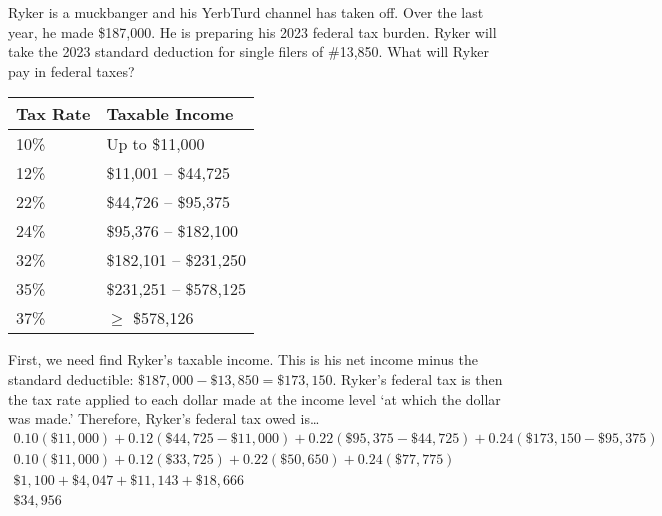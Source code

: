 \documentclass[12pt,letterpaper]{exam}
\begin{document}
\examtitle
{} 
\scores
\bottomline
\newpage

\begin{questions}

\newpage
\question[10] Ryker is a muckbanger and his YerbTurd channel has taken off. Over the last year, he made \$187,000. He is preparing his 2023 federal tax burden. Ryker will take the 2023 standard deduction for single filers of \#13,850. What will Ryker pay in federal taxes? 
	\begin{table}[H]
	\centering
	\begin{tabular}{|l|l|} \hline
	Tax Rate & Taxable Income \\ \hline \hline
	10\% & Up to \$11,000 \\ \hline
	12\% & \$11,001 -- \$44,725 \\ \hline
	22\% & \$44,726 -- \$95,375 \\ \hline
	24\% & \$95,376 -- \$182,100 \\ \hline
	32\% & \$182,101 -- \$231,250 \\ \hline
	35\% & \$231,251 -- \$578,125 \\ \hline
	37\% & $\geq$ \$578,126 \\ \hline
	\end{tabular}
	\end{table} \pspace

\sol First, we need find Ryker's taxable income. This is his net income minus the standard deductible: $\$187,\!000 - \$13,\!850= \$173,\!150$. Ryker's federal tax is then the tax rate applied to each dollar made at the income level `at which the dollar was made.' Therefore, Ryker's federal tax owed is\dots
	\[
	\begin{gathered}
	0.10(\$11,\!000) + 0.12(\$44,\!725 - \$11,\!000) + 0.22(\$95,\!375 - \$44,\!725) + 0.24(\$173,\!150 -\$95,\!375) \\[0.3cm]
	0.10(\$11,\!000) + 0.12(\$33,\!725) + 0.22(\$50,\!650) + 0.24(\$77,\!775) \\[0.3cm]
	\$1,\!100 + \$4,\!047 + \$11,\!143 + \$18,\!666 \\[0.3cm]
	\$34,\!956
	\end{gathered}
	\]




\end{questions}
\end{document}
